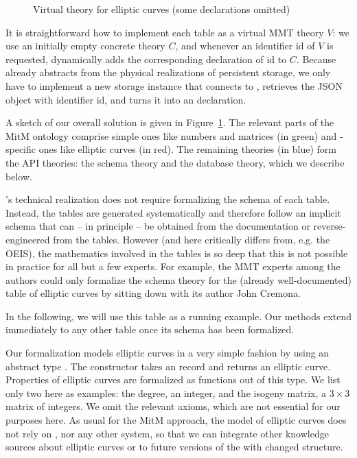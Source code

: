\begin{figure}[ht]
{
    }
    \endgroup
  \caption[Virtual Theory Architecture]{
    Virtual theory for \lmfdb elliptic curves (some declarations omitted) 
  }
  \label{fig:vtarch}
\end{figure}
It is straightforward how to implement each \lmfdb table as a virtual MMT theory $V$: we use an initially empty concrete theory $C$, and whenever an identifier \textsf{id} of $V$ is requested, \mmt dynamically adds the corresponding declaration of \textsf{id} to $C$.
Because \mmt already abstracts from the physical realizations of persistent storage, we only have to implement a new storage instance that connects to \lmfdb, retrieves the JSON object with identifier \textsf{id}, and turns it into an \ommt declaration.

A sketch of our overall solution is given in Figure~\ref{fig:vtarch}.
The relevant parts of the MitM ontology comprise simple ones like numbers and matrices (in green) and \lmfdb-specific ones like elliptic curves (in red).
The remaining theories (in blue) form the \lmfdb API theories: the schema theory and the database theory, which we describe below.

\lmfdb's technical realization does not require formalizing the schema of each table. 
Instead, the tables are generated systematically and therefore follow an implicit schema that can -- in principle -- be obtained from the documentation or reverse-engineered from the tables. 
However (and here \lmfdb critically differs from, e.g. the OEIS), the mathematics involved in the tables is so deep that this is not possible in practice for all but a few experts. 
For example, the MMT experts among the authors could only formalize the schema theory for the (already well-documented) table of elliptic curves by sitting down with its author John Cremona.

In the following, we will use this table as a running example.
Our methods extend immediately to any other table once its schema has been formalized.

Our formalization models elliptic curves in a very simple fashion by using an abstract type . 
The constructor  takes an \mmt record and returns an elliptic curve. 
Properties of elliptic curves are formalized as functions out of this type.
We list only two here as examples: the \textsf{degree}, an integer, and the \textsf{isogeny matrix}, a $3 \times 3$ matrix of integers.
We omit the relevant axioms, which are not essential for our purposes here.
As usual for the MitM approach, the model of elliptic curves does not rely on \lmfdb, nor any other system, so that we can integrate other knowledge sources about elliptic curves or to future versions of the \lmfdb with changed structure. 


